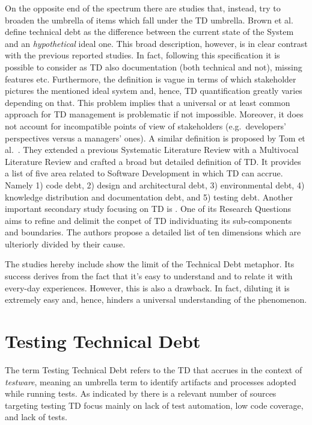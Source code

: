 On the opposite end of the spectrum there are studies that, instead, try to broaden the umbrella of items which fall under the TD umbrella. Brown et al.\ \cite{td_current_vs_optimal_quality} define technical debt as the difference between the current state of the System and an \textit{hypothetical} ideal one. This broad description, however, is in clear contrast with the previous reported studies. In fact, following this specification it is possible to consider as TD also documentation (both technical and not), missing features etc. Furthermore, the definition is vague in terms of which stakeholder pictures the mentioned ideal system and, hence, TD quantification greatly varies depending on that. This problem implies that a universal or at least common approach for TD management is problematic if not impossible. Moreover, it does not account for incompatible points of view of stakeholders (e.g.\ developers' perspectives versus a managers' ones). A similar definition is proposed by Tom et al.\ \cite{exploration_of_td}. They extended a previous Systematic Literature Review \cite{slr,exploration_of_td_2} with a Multivocal Literature Review \cite{multivocal_literature_review} and crafted a broad but detailed definition of TD. It provides a list of five area related to Software Development in which TD can accrue. Namely 1) code debt, 2) design and architectural debt, 3) environmental debt, 4) knowledge distribution and documentation debt, and 5) testing debt. Another important secondary study focusing on TD is \cite{mapping_study_td}. One of its Research Questions aims to refine and delimit the conpet of TD individuating its sub-components and boundaries. The authors propose a detailed list of ten dimensions which are ulteriorly divided by their cause.

The studies hereby include show the limit of the Technical Debt metaphor. Its success derives from the fact that it's easy to understand and to relate it with every-day experiences. However, this is also a drawback. In fact, diluting it is extremely easy and, hence, hinders a universal understanding of the phenomenon.

\section{Testing Technical Debt} \label{testing_td}
The term Testing Technical Debt refers to the TD that accrues in the context of \textit{testware}, meaning an umbrella term to identify artifacts and processes adopted while running tests. As indicated by \cite{mapping_study_td} there is a relevant number of sources targeting testing TD focus mainly on lack of test automation, low code coverage, and lack of tests.  %

